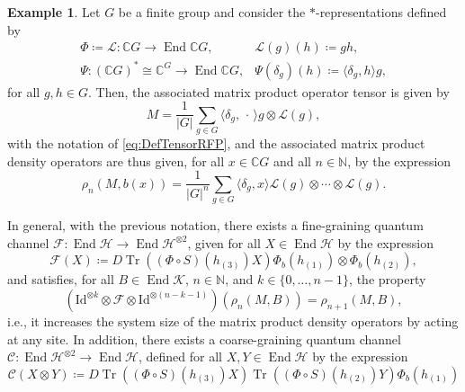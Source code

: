 \documentclass[a4paper,10pt]{amsart}
\newcommand{\Fine}{\mathcal{F}}
\newcommand{\Coarse}{\mathcal{C}}
\newcommand{\eval}[2]{\langle #1 , #2\rangle}
\newcommand{\placeholder}{\,\cdot\,}
\theoremstyle{definition}
\newtheorem{example}[theorem]{Example}
\begin{document}
\begin{example}
\label{example:RFPTensorCG}
	Let $G$ be a finite group and consider the $*$-representations defined by
    \begin{equation*}
    \begin{array}{ll}
        \Phi \coloneqq \mathcal{L}:\mathbb{C}G \to \operatorname{End} \mathbb{C}G, 
        &
        \mathcal{L}(g)(h) \coloneqq gh,
        \\[5pt]
        \Psi:(\mathbb{C}G)^*\cong \mathbb{C}^G\to\operatorname{End}\mathbb{C}G,
        &
        \Psi(\delta_g)(h)  \coloneqq \eval{\delta_g}{h} g,
    \end{array}
    \end{equation*}
    for all $g,h\in G$.
    Then, the associated matrix product ope\-ra\-tor tensor is given by
	\[
		M
        =
        \frac{1}{|G|}\sum_{g\in G}
        \eval{\delta_g}{\placeholder} g \otimes \mathcal{L}(g),
	\]
    with the notation of \cref{eq:DefTensorRFP}, and the associated matrix product density operators are thus given, for all $x\in\mathbb{C}G$ and all $n\in\mathbb{N}$, by the expression
    \[
        \rho_{n}(M,b(x))
        =
        \frac{1}{|G|^n}
        \sum_{g\in G}
        \eval{\delta_g}{x} \mathcal{L}(g)\otimes\cdots \otimes\mathcal{L}(g).
    \]
\end{example}
In general, with the previous notation, there exists a fine-graining quantum channel $\Fine:\operatorname{End}\mathscr{H}\to\operatorname{End}\mathscr{H}^{\otimes 2}$, given for all $X\in\operatorname{End}\mathscr{H}$ by the expression
\begin{equation}
    \Fine(X) \coloneqq  D \operatorname{Tr}((\Phi\circ S)(h_{(3)})X) \Phi_b(h_{(1)}) \otimes  \Phi_b(h_{(2)}),
\end{equation}
and satisfies, for all $B\in \operatorname{End}\mathscr{K}$, $n\in\mathbb{N}$, and $k\in\{0,\ldots,n-1\}$, the property
\begin{equation}\label{eq:PropertyFine}
    (\mathrm{Id}^{\otimes k} \otimes \Fine \otimes \mathrm{Id}^{\otimes (n-k-1)})(\rho_n(M,B)) = \rho_{n+1}(M,B),
\end{equation}
i.e., it increases the system size of the matrix product density operators by acting at any site. In addition, there exists a coarse-graining quantum channel $\Coarse:\operatorname{End}\mathscr{H}^{\otimes 2}\to\operatorname{End}\mathscr{H}$, defined for all $X,Y\in\operatorname{End}\mathscr{H}$ by the expression
\begin{equation}
    \Coarse(X\otimes Y) \coloneqq D
        \operatorname{Tr}((\Phi\circ S)(h_{(3)}) X)
        \operatorname{Tr}((\Phi\circ S)(h_{(2)}) Y)
        \Phi_b(h_{(1)})
\end{equation}
\end{document}

